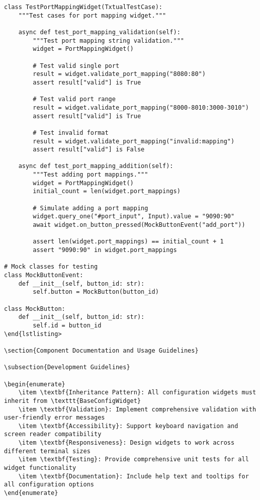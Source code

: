 \documentclass[11pt,a4paper]{article}
\begin{document}
\begin{lstlisting}[caption={Component Testing Framework}]
class TestPortMappingWidget(TxtualTestCase):
    """Test cases for port mapping widget."""
    
    async def test_port_mapping_validation(self):
        """Test port mapping string validation."""
        widget = PortMappingWidget()
        
        # Test valid single port
        result = widget.validate_port_mapping("8080:80")
        assert result["valid"] is True
        
        # Test valid port range
        result = widget.validate_port_mapping("8000-8010:3000-3010")
        assert result["valid"] is True
        
        # Test invalid format
        result = widget.validate_port_mapping("invalid:mapping")
        assert result["valid"] is False
        
    async def test_port_mapping_addition(self):
        """Test adding port mappings."""
        widget = PortMappingWidget()
        initial_count = len(widget.port_mappings)
        
        # Simulate adding a port mapping
        widget.query_one("#port_input", Input).value = "9090:90"
        await widget.on_button_pressed(MockButtonEvent("add_port"))
        
        assert len(widget.port_mappings) == initial_count + 1
        assert "9090:90" in widget.port_mappings

# Mock classes for testing
class MockButtonEvent:
    def __init__(self, button_id: str):
        self.button = MockButton(button_id)
        
class MockButton:
    def __init__(self, button_id: str):
        self.id = button_id
\end{lstlisting>

\section{Component Documentation and Usage Guidelines}

\subsection{Development Guidelines}

\begin{enumerate}
    \item \textbf{Inheritance Pattern}: All configuration widgets must inherit from \texttt{BaseConfigWidget}
    \item \textbf{Validation}: Implement comprehensive validation with user-friendly error messages
    \item \textbf{Accessibility}: Support keyboard navigation and screen reader compatibility
    \item \textbf{Responsiveness}: Design widgets to work across different terminal sizes
    \item \textbf{Testing}: Provide comprehensive unit tests for all widget functionality
    \item \textbf{Documentation}: Include help text and tooltips for all configuration options
\end{enumerate}


\end{lstlisting}
\end{document}

